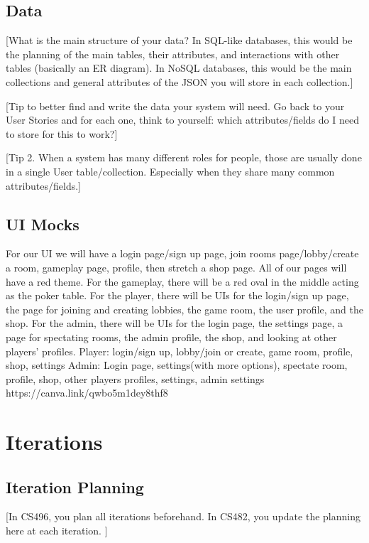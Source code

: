 \documentclass{article}
\begin{document}
\subsection{Data}
[What is the main structure of your data? In SQL-like databases, this would be the planning of the main tables, their attributes, and interactions with other tables (basically an ER diagram). In NoSQL databases, this would be the main collections and general attributes of the JSON you will store in each collection.]

[Tip to better find and write the data your system will need. Go back to your User Stories and for each one, think to yourself: which attributes/fields do I need to store for this to work?]

[Tip 2. When a system has many different roles for people, those are usually done in a single User table/collection. Especially when they share many common attributes/fields.]

\subsection{UI Mocks}
For our UI we will have a login page/sign up page, join rooms page/lobby/create a room, gameplay page, profile, then stretch a shop page. All of our pages will have a red theme.
For the gameplay, there will be a red oval in the middle acting as the poker table. 
For the player, there will be UIs for the login/sign up page, the page for joining and creating lobbies, the game room, the user profile, and the shop.
For the admin, there will be UIs for the login page, the settings page, a page for spectating rooms, the admin profile, the shop, and looking at other players’ profiles.
Player: login/sign up, lobby/join or create, game room, profile, shop, settings
Admin: Login page, settings(with more options), spectate room,  profile, shop, other players profiles, settings, admin settings
https://canva.link/qwbo5m1dey8thf8



\section{Iterations}

\subsection{Iteration Planning}
[In CS496, you plan all iterations beforehand. In CS482, you update the planning here at each iteration. ]\\
\end{document}
